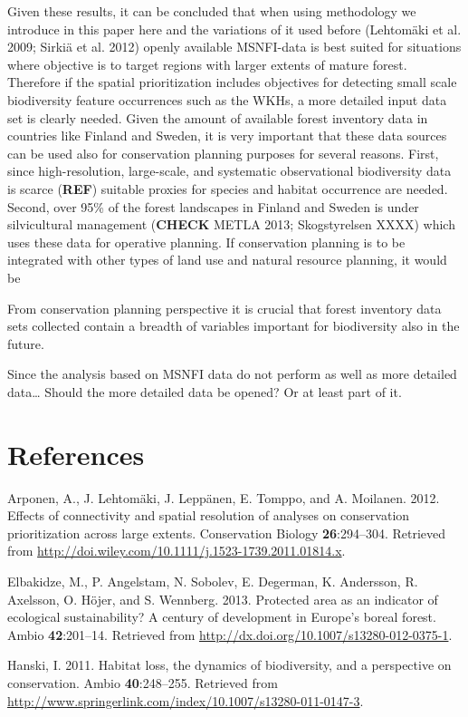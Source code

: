 \documentclass[]{article}
\begin{document}
Given these results, it can be concluded that when using methodology we
introduce in this paper here and the variations of it used before
(Lehtomäki et al. 2009; Sirkiä et al. 2012) openly available MSNFI-data
is best suited for situations where objective is to target regions with
larger extents of mature forest. Therefore if the spatial prioritization
includes objectives for detecting small scale biodiversity feature
occurrences such as the WKHs, a more detailed input data set is clearly
needed. Given the amount of available forest inventory data in countries
like Finland and Sweden, it is very important that these data sources
can be used also for conservation planning purposes for several reasons.
First, since high-resolution, large-scale, and systematic observational
biodiversity data is scarce (\textbf{REF}) suitable proxies for species
and habitat occurrence are needed. Second, over 95\% of the forest
landscapes in Finland and Sweden is under silvicultural management
(\textbf{CHECK} METLA 2013; Skogstyrelsen XXXX) which uses these data
for operative planning. If conservation planning is to be integrated
with other types of land use and natural resource planning, it would be

From conservation planning perspective it is crucial that forest
inventory data sets collected contain a breadth of variables important
for biodiversity also in the future.

Since the analysis based on MSNFI data do not perform as well as more
detailed data\ldots{} Should the more detailed data be opened? Or at
least part of it.

\section{References}

Arponen, A., J. Lehtomäki, J. Leppänen, E. Tomppo, and A. Moilanen.
2012. Effects of connectivity and spatial resolution of analyses on
conservation prioritization across large extents. Conservation Biology
\textbf{26}:294--304. Retrieved from
\url{http://doi.wiley.com/10.1111/j.1523-1739.2011.01814.x}.

Elbakidze, M., P. Angelstam, N. Sobolev, E. Degerman, K. Andersson, R.
Axelsson, O. Höjer, and S. Wennberg. 2013. Protected area as an
indicator of ecological sustainability? A century of development in
Europe's boreal forest. Ambio \textbf{42}:201--14. Retrieved from
\url{http://dx.doi.org/10.1007/s13280-012-0375-1}.

Hanski, I. 2011. Habitat loss, the dynamics of biodiversity, and a
perspective on conservation. Ambio \textbf{40}:248--255. Retrieved from
\url{http://www.springerlink.com/index/10.1007/s13280-011-0147-3}.
\end{document}
